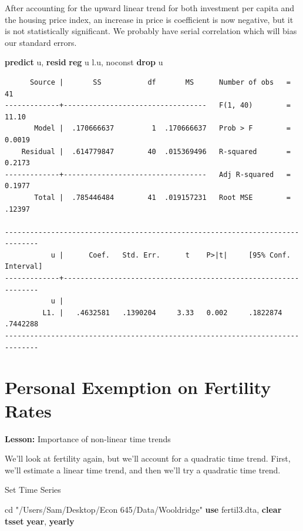 \documentclass[
]{book}
\newenvironment{Shaded}{\begin{snugshade}}{\end{snugshade}}
\newcommand{\FunctionTok}[1]{\textcolor[rgb]{0.13,0.29,0.53}{\textbf{#1}}}
\newcommand{\KeywordTok}[1]{\textcolor[rgb]{0.13,0.29,0.53}{\textbf{#1}}}
\newcommand{\NormalTok}[1]{#1}
\newcommand{\OtherTok}[1]{\textcolor[rgb]{0.56,0.35,0.01}{#1}}
\newcommand{\StringTok}[1]{\textcolor[rgb]{0.31,0.60,0.02}{#1}}
\begin{document}
After accounting for the upward linear trend for both investment per capita and
the housing price index, an increase in price is coefficient is now negative, but
it is not statistically significant. We probably have serial correlation which
will bias our standard errors.

\begin{Shaded}
\begin{Highlighting}[]
\KeywordTok{predict}\NormalTok{ u, }\KeywordTok{resid}
\KeywordTok{reg}\NormalTok{ u }\OtherTok{l}\NormalTok{.u, noconst}
\KeywordTok{drop}\NormalTok{ u}
\end{Highlighting}
\end{Shaded}

\begin{verbatim}
      Source |       SS           df       MS      Number of obs   =        41
-------------+----------------------------------   F(1, 40)        =     11.10
       Model |  .170666637         1  .170666637   Prob > F        =    0.0019
    Residual |  .614779847        40  .015369496   R-squared       =    0.2173
-------------+----------------------------------   Adj R-squared   =    0.1977
       Total |  .785446484        41  .019157231   Root MSE        =    .12397

------------------------------------------------------------------------------
           u |      Coef.   Std. Err.      t    P>|t|     [95% Conf. Interval]
-------------+----------------------------------------------------------------
           u |
         L1. |   .4632581   .1390204     3.33   0.002     .1822874    .7442288
------------------------------------------------------------------------------
\end{verbatim}

\section{Personal Exemption on Fertility Rates}\label{personal-exemption-on-fertility-rates-1}

\textbf{Lesson:} Importance of non-linear time trends

We'll look at fertility again, but we'll account for a quadratic time trend.
First, we'll estimate a linear time trend, and then we'll try a quadratic time trend.

Set Time Series

\begin{Shaded}
\begin{Highlighting}[]
\NormalTok{cd }\StringTok{"/Users/Sam/Desktop/Econ 645/Data/Wooldridge"}
\KeywordTok{use}\NormalTok{ fertil3.dta, }\KeywordTok{clear}
\KeywordTok{tsset} \FunctionTok{year}\NormalTok{, }\FunctionTok{yearly}
\end{Highlighting}
\end{Shaded}
\end{document}
